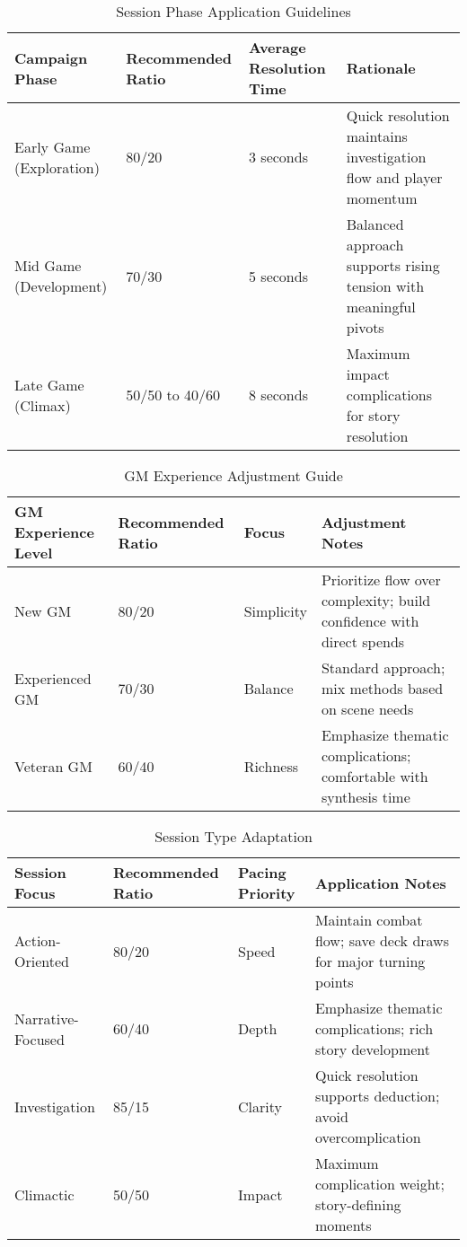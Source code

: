 \begin{table}[htbp]
\centering
\caption{Session Phase Application Guidelines}
\begin{tabular}{|p{2.5cm}|p{2.5cm}|p{2.5cm}|p{5cm}|}
\hline
\textbf{Campaign Phase} & \textbf{Recommended Ratio} & \textbf{Average Resolution Time} & \textbf{Rationale} \\
\hline
Early Game (Exploration) & 80/20 & 3 seconds & Quick resolution maintains investigation flow and player momentum \\
\hline
Mid Game (Development) & 70/30 & 5 seconds & Balanced approach supports rising tension with meaningful pivots \\
\hline
Late Game (Climax) & 50/50 to 40/60 & 8 seconds & Maximum impact complications for story resolution \\
\hline
\end{tabular}
\end{table}

\begin{table}[htbp]
\centering
\caption{GM Experience Adjustment Guide}
\begin{tabular}{|p{3cm}|p{3cm}|p{3cm}|p{4cm}|}
\hline
\textbf{GM Experience Level} & \textbf{Recommended Ratio} & \textbf{Focus} & \textbf{Adjustment Notes} \\
\hline
New GM & 80/20 & Simplicity & Prioritize flow over complexity; build confidence with direct spends \\
\hline
Experienced GM & 70/30 & Balance & Standard approach; mix methods based on scene needs \\
\hline
Veteran GM & 60/40 & Richness & Emphasize thematic complications; comfortable with synthesis time \\
\hline
\end{tabular}
\end{table}

\begin{table}[htbp]
\centering
\caption{Session Type Adaptation}
\begin{tabular}{|p{3cm}|p{3cm}|p{3cm}|p{4cm}|}
\hline
\textbf{Session Focus} & \textbf{Recommended Ratio} & \textbf{Pacing Priority} & \textbf{Application Notes} \\
\hline
Action-Oriented & 80/20 & Speed & Maintain combat flow; save deck draws for major turning points \\
\hline
Narrative-Focused & 60/40 & Depth & Emphasize thematic complications; rich story development \\
\hline
Investigation & 85/15 & Clarity & Quick resolution supports deduction; avoid overcomplication \\
\hline
Climactic & 50/50 & Impact & Maximum complication weight; story-defining moments \\
\hline
\end{tabular}
\end{table}

